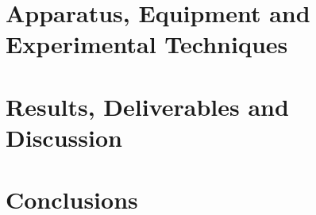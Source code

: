 \documentclass[12pt]{article}
\begin{document}
\section{Apparatus, Equipment and Experimental Techniques}

\newpage



%
%

\section{Results, Deliverables and Discussion}

\newpage



%
%

\section{Conclusions}

\newpage



\noindent

\markboth{}{}
\printbibliography
\markboth{}{}

\newpage
\end{document}
